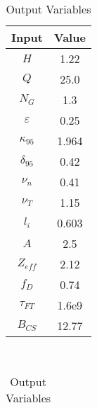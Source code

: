 \begin{table}[b!]
\centering
\caption{ACT II Variables}
\hfill
\begin{subtable}[t]{0.4\textwidth}
\centering
\caption{Input Variables} ~\\
\begin{tabular}{ c|c }

Input            & Value           \\
\hline
$H$              & 1.22            \\
$Q$              & 25.0            \\
$N_{G}$          & 1.3             \\
$\varepsilon$       & 0.25            \\
$\kappa_{95}$    & 1.964           \\
$\delta_{95}$    & 0.42            \\
$\nu_{n}$        & 0.41            \\
$\nu_{T}$        & 1.15            \\
$l_{i}$          & 0.603         \\
$A$              & 2.5             \\
$Z_{eff}$        & 2.12            \\
$f_{D}$          & 0.74            \\
$\tau_{FT}$      & 1.6e9           \\
$B_{CS}$         & 12.77           \\

\end{tabular}
\end{subtable}
\hfill
\begin{subtable}[t]{0.5\textwidth}
\centering
\caption{Output Variables} ~\\
\begin{tabular}{ c|c|c }


\end{tabular}
\end{subtable}
\end{table}
